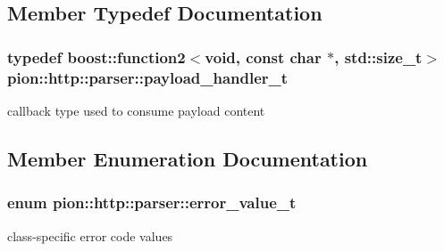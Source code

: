 \subsection{Member Typedef Documentation}
\hypertarget{classpion_1_1http_1_1parser_abff772b79d2a912b0f9a4932d8f03a35}{
\subsubsection[{payload\-\_\-handler\-\_\-t}]{\setlength{\rightskip}{0pt plus 5cm}typedef boost\-::function2$<$void, const char $\ast$, std\-::size\-\_\-t$>$ {\bf pion\-::http\-::parser\-::payload\-\_\-handler\-\_\-t}}}\label{classpion_1_1http_1_1parser_abff772b79d2a912b0f9a4932d8f03a35}


callback type used to consume payload content 



\subsection{Member Enumeration Documentation}
\hypertarget{classpion_1_1http_1_1parser_a056c791c4b2dda0dd4c2037dd941d5d8}{
\subsubsection[{error\-\_\-value\-\_\-t}]{\setlength{\rightskip}{0pt plus 5cm}enum {\bf pion\-::http\-::parser\-::error\-\_\-value\-\_\-t}}}\label{classpion_1_1http_1_1parser_a056c791c4b2dda0dd4c2037dd941d5d8}


class-\/specific error code values 

